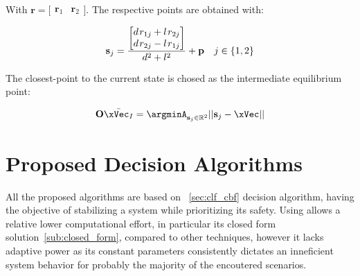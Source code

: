     

With \(\mathbf{r} = \bigl[\begin{smallmatrix} \mathbf{r}_1&\mathbf{r}_2\end{smallmatrix} \bigr]\). The respective points are obtained with:

\begin{equation}
    \mathbf{s}_j = \frac{\begin{bmatrix} d \hspace{0.1em}r_{1j} + l \hspace{0.1em}r_{2j} \\ d \hspace{0.1em} r_{2j} - l \hspace{0.1em} r_{1j}\end{bmatrix}}{d^2 + l^2} + \mathbf{p} \quad j\in \{1,2\}
    \label{eq:Constraint_Tangent_Points}
\end{equation}

The closest-point to the current state is chosed as the intermediate equilibrium point:

\begin{equation}
    \mathbf{O}\bar{\xVec_I} = \argminA_{\mathbf{s}_j \in \mathbb{R}^2} ||\mathbf{s}_j - \xVec|| 
    \label{eq:Intermediate_Equilibrium_Point}
\end{equation}



\newpage %


\section{Proposed Decision Algorithms}
\label{sec:Proposed_Decision_Algorithms}

All the proposed algorithms are based on ~\ref{sec:clf_cbf} decision algorithm, having the objective of stabilizing a system while prioritizing its safety. Using  allows a relative lower computational effort, in particular its closed form solution~\ref{sub:closed_form}, compared to other techniques, however it lacks adaptive power as its constant parameters consistently dictates an inneficient system behavior for probably the majority of the encoutered scenarios. \\    


